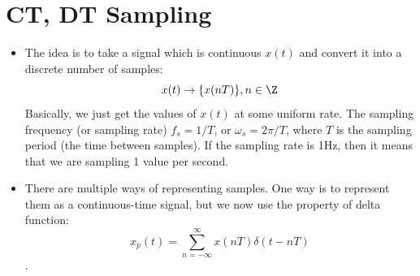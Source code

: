 \section{CT, DT Sampling}
\begin{itemize}
	\item The idea is to take a signal which is continuous \( x(t) \) and convert it into a discrete
		number of samples:
		\[
		x(t) \to \{x(nT)\}, n \in \Z
		\] 
		Basically, we just get the values of \( x(t) \) at some uniform rate. The sampling frequency 
		(or sampling rate) \( f_s = 1 / T \), or \( \omega_s = 2\pi / T \), where \( T \) is the 
		sampling period (the time between samples). If the sampling rate is 1Hz, then it means that we are 
		sampling 1 value per second.  
	\item There are multiple ways of representing samples. One way is to represent them as a continuous-time 
		signal, but we now use the property of delta function:
		\[
		x_p(t) = \sum_{n=-\infty}^{\infty} x(nT) \delta(t - nT)
		\] 
		.



\end{itemize}
